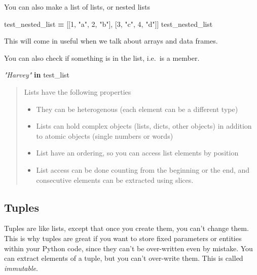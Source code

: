 \documentclass[
  letterpaper,
]{scrbook}
\newenvironment{Shaded}{\begin{snugshade}}{\end{snugshade}}
\newcommand{\CommentTok}[1]{\textcolor[rgb]{0.56,0.35,0.01}{\textit{#1}}}
\newcommand{\DecValTok}[1]{\textcolor[rgb]{0.00,0.00,0.81}{#1}}
\newcommand{\KeywordTok}[1]{\textcolor[rgb]{0.13,0.29,0.53}{\textbf{#1}}}
\newcommand{\NormalTok}[1]{#1}
\newcommand{\OperatorTok}[1]{\textcolor[rgb]{0.81,0.36,0.00}{\textbf{#1}}}
\newcommand{\StringTok}[1]{\textcolor[rgb]{0.31,0.60,0.02}{#1}}
\providecommand{\tightlist}{%
  \setlength{\itemsep}{0pt}\setlength{\parskip}{0pt}}
\begin{document}
You can also make a list of lists, or nested lists

\begin{Shaded}
\begin{Highlighting}[]
\NormalTok{test\_nested\_list }\OperatorTok{=}\NormalTok{ [[}\DecValTok{1}\NormalTok{, }\StringTok{"a"}\NormalTok{, }\DecValTok{2}\NormalTok{, }\StringTok{"b"}\NormalTok{], [}\DecValTok{3}\NormalTok{, }\StringTok{"c"}\NormalTok{, }\DecValTok{4}\NormalTok{, }\StringTok{"d"}\NormalTok{]]}
\NormalTok{test\_nested\_list}
\end{Highlighting}
\end{Shaded}

This will come in useful when we talk about arrays and data frames.

You can also check if something is in the list, i.e.~is a member.

\begin{Shaded}
\begin{Highlighting}[]
\CommentTok{"Harvey"} \KeywordTok{in}\NormalTok{ test\_list}
\end{Highlighting}
\end{Shaded}

\begin{quote}
Lists have the following properties

\begin{itemize}
\tightlist
\item
  They can be heterogenous (each element can be a different type)
\item
  Lists can hold complex objects (lists, dicts, other objects) in addition to atomic objects (single numbers or words)
\item
  List have an ordering, so you can access list elements by position
\item
  List access can be done counting from the beginning or the end, and consecutive elements can be extracted using slices.
\end{itemize}
\end{quote}

\hypertarget{tuples}{%
\subsection{Tuples}\label{tuples}}

Tuples are like lists, except that once you create them, you can't change them.
This is why tuples are great if you want to store fixed parameters or entities
within your Python code, since they can't be over-written even by mistake. You
can extract elements of a tuple, but you can't over-write them. This is called
\emph{immutable}.
\end{document}
